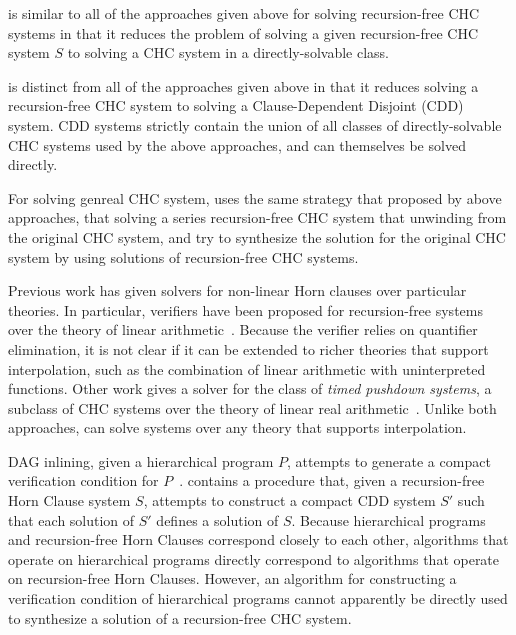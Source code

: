 \sys is similar to all of the approaches given above for solving 
recursion-free CHC systems in that it reduces the problem of solving a
given recursion-free CHC system $S$ to solving a CHC system
in a directly-solvable class.
%


\sys is distinct from all of the approaches given above in that it
reduces solving a recursion-free CHC system to solving a
Clause-Dependent Disjoint (CDD) system.
%
CDD systems strictly contain the union of all classes of
directly-solvable CHC systems used by the above approaches, and can
themselves be solved directly.

%
For solving genreal CHC system, \sys uses the same strategy that proposed
by above approaches, that solving a series recursion-free CHC system that unwinding 
from the original CHC system, and try to synthesize the solution for the original 
CHC system by using solutions of recursion-free CHC systems.  

Previous work has given solvers for non-linear Horn clauses over
particular theories.
%
In particular, verifiers have been proposed for recursion-free systems
over the theory of linear arithmetic~\cite{komuravelli14}.
%
Because the verifier relies on quantifier elimination, it is not clear
if it can be extended to richer theories that support interpolation,
such as the combination of linear arithmetic with uninterpreted
functions.
%
Other work gives a solver for the class of \emph{timed pushdown
  systems}, a subclass of CHC systems over the theory of linear real
arithmetic~\cite{hoder12}.
%
Unlike both approaches, \sys can solve systems over any theory that
supports interpolation.

DAG inlining, given a hierarchical program $P$, attempts to generate a
compact verification condition for $P$~\cite{lal-qadeer15}.
%
\sys contains a procedure that, given a recursion-free Horn Clause
system $S$, attempts to construct a compact CDD system
$S'$ such that each solution of $S'$ defines a
solution of $S$.
%
Because hierarchical programs and recursion-free Horn Clauses
correspond closely to each other, algorithms that operate on
hierarchical programs directly correspond to algorithms that operate
on recursion-free Horn Clauses.
%
However, an algorithm for constructing a verification condition of
hierarchical programs cannot apparently be directly used to synthesize
a solution of a recursion-free CHC system.

